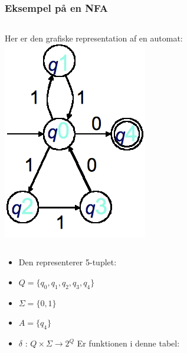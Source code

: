 \newcommand{\sarrow}[1]{\overset{#1}{\rightarrow}}

\begin{frame}
\frametitle{Eksempel på en NFA}
\begin{columns}
\column{9cm}Her er den grafiske representation af en automat:
\column{3cm}\includegraphics[scale=0.3]{images/2_seminar_nondet_states}
\end{columns}
\begin{itemize}[<+->]
  \item Den representerer 5-tuplet:
  \item $Q=\{q_0,q_1,q_2,q_3,q_4\}$
  \item $\Sigma = \{0,1\}$
  \item $A=\{q_4\}$
  \item
      $\delta$ : $Q\times \Sigma \rightarrow 2^Q$ Er funktionen i
      denne tabel: 

  \end{itemize}
\end{frame}
